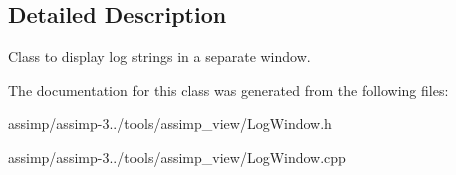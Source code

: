 \subsection{Detailed Description}
Class to display log strings in a separate window. 

The documentation for this class was generated from the following files\+:\begin{DoxyCompactItemize}
\item 
assimp/assimp-\/3../tools/assimp\+\_\+view/Log\+Window.\+h\item 
assimp/assimp-\/3../tools/assimp\+\_\+view/Log\+Window.\+cpp\end{DoxyCompactItemize}
